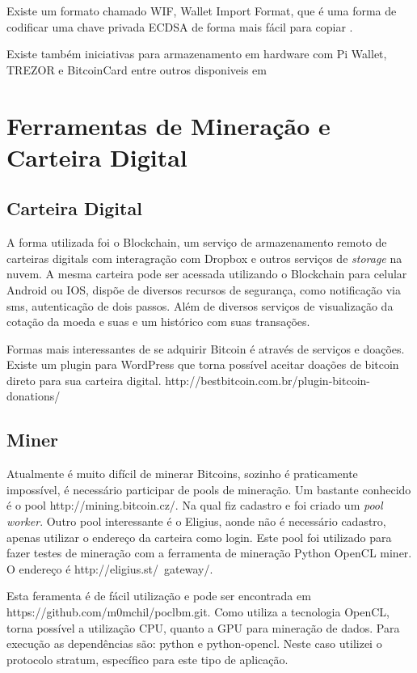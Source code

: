 \documentclass[a4paper,11pt]{article}
\theoremstyle{mytheor}
\begin{document}
Existe um formato chamado WIF, Wallet Import Format, que é uma forma de codificar uma chave privada ECDSA de forma mais fácil para copiar \cite{wif}. 

Existe também iniciativas para armazenamento em hardware com Pi Wallet, TREZOR e BitcoinCard entre outros disponiveis em \cite{hardWallet}

\section*{Ferramentas de Mineração e Carteira Digital}

\subsection*{Carteira Digital}

A forma utilizada foi o Blockchain, um serviço de armazenamento remoto de carteiras digitals com interagração com Dropbox e outros serviços de \textit{storage} na nuvem. A mesma carteira pode ser acessada utilizando o Blockchain para celular Android ou IOS, dispõe de diversos recursos de segurança, como notificação via sms, autenticação de dois passos. Além de diversos serviços de visualização da cotação da moeda e suas e um histórico com suas transações.


Formas mais interessantes de se adquirir Bitcoin é através de serviços e doações. Existe um plugin para WordPress que torna possível aceitar doações de bitcoin direto para sua carteira digital. http://bestbitcoin.com.br/plugin-bitcoin-donations/

\subsection*{Miner}

Atualmente é muito difícil de minerar Bitcoins, sozinho é praticamente impossível, é necessário participar de pools de mineração. Um bastante conhecido é o pool http://mining.bitcoin.cz/. Na qual fiz cadastro e foi criado um \textit{pool worker}.
Outro pool interessante é o Eligius, aonde não é necessário cadastro, apenas utilizar o endereço da carteira como login. Este pool foi utilizado para fazer testes de mineração com a ferramenta de mineração Python OpenCL miner. O endereço é http://eligius.st/~gateway/.

Esta feramenta é de fácil utilização e pode ser encontrada em https://github.com/m0mchil/poclbm.git. Como utiliza a tecnologia OpenCL, torna possível a utilização CPU, quanto a GPU para mineração de dados. Para execução as dependências são: python e python-opencl. Neste caso utilizei o protocolo stratum, específico para este tipo de aplicação.
\end{document}
